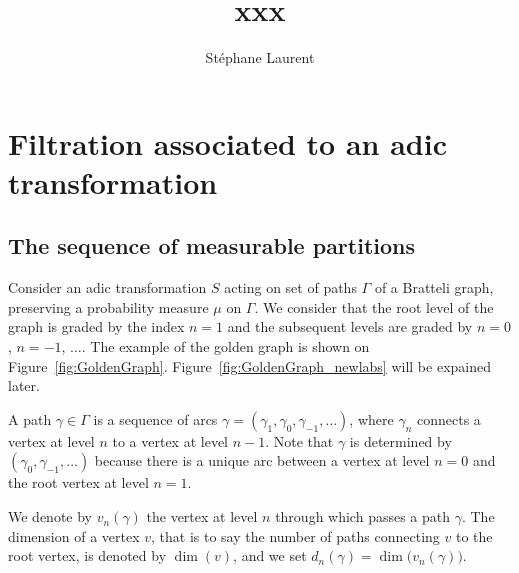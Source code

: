 \documentclass[12pt,a4paper]{article}
\author{Stéphane Laurent}
\title{xxx}
\begin{document}
\theoremstyle{defstyle}
\newtheorem{definition}{Definition}
\newtheorem{remark}{Remark}    
\theoremstyle{thmstyle}
\newtheorem{thm}{Theorem}[section]
\newtheorem{ppsition}{Proposition}
\newtheorem{lemma}{Lemma}

\newcommand{\FF}{\mathcal{F}}
\newcommand{\GG}{\mathcal{G}}
\newcommand{\EE}{\mathbb{E}}
\newcommand{\II}{\mathcal{I}}
\newcommand{\LL}{\mathcal{L}}
\newcommand{\OO}{\mathcal{O}}
\newcommand{\given}{\mid}
\newcommand{\eps}{\epsilon}
\newcommand{\indic}{\boldsymbol 1}
\newcommand{\Vb}{\boldsymbol V}


\maketitle

\section{Filtration associated to an adic transformation} 

\subsection{The sequence of measurable partitions}

Consider an adic transformation $S$ acting on set of paths $\Gamma$ of a 
Bratteli graph, preserving a probability measure $\mu$ on $\Gamma$. 
We consider that the root level of the graph is graded by the index 
$n=1$ and the subsequent levels are graded by $n=0$, $n=-1$, $\ldots$. 
The example of the golden graph is shown on Figure~\ref{fig:GoldenGraph}. 
Figure~\ref{fig:GoldenGraph_newlabs} will be expained later.

A path $\gamma \in \Gamma$ is a sequence of arcs 
$\gamma=(\gamma_{1}, \gamma_0, \gamma_{-1}, \ldots)$, where $\gamma_n$ connects 
a vertex at level $n$ to a vertex at level $n-1$. 
Note that $\gamma$ is determined by $(\gamma_0, \gamma_{-1}, \ldots)$ 
because there is a unique arc between a vertex at level $n=0$ and the root vertex 
at level $n=1$.  

We denote by $v_n(\gamma)$ the vertex at level $n$ through which passes a path $\gamma$. 
The dimension of a vertex $v$, that is to say the number of paths connecting $v$ 
to the root vertex, is denoted by $\dim(v)$, and we set $d_n(\gamma)=\dim\bigl(v_n(\gamma)\bigr)$. 
\end{document}
